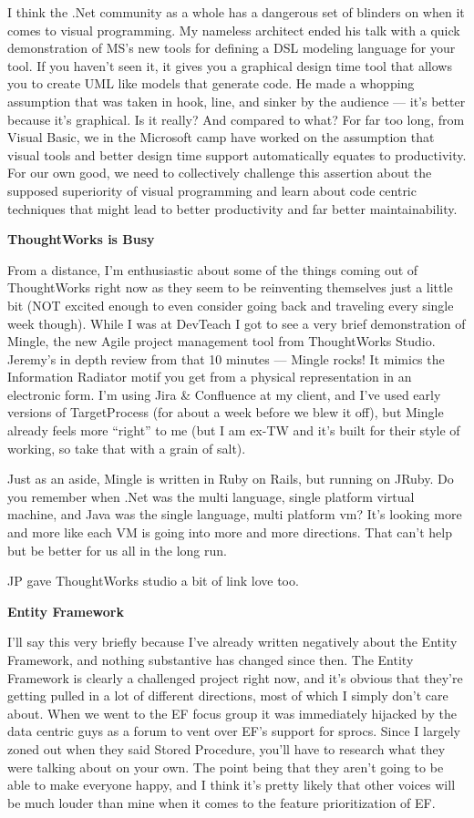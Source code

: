 \documentclass{article}
\begin{document}
{I think the .Net community as a whole has a dangerous set of blinders on when it comes to visual programming.  My nameless architect ended his talk with a quick demonstration of MS's new tools for defining a DSL modeling language for your tool.  If you haven't seen it, it gives you a graphical design time tool that allows you to create UML like models that generate code.  He made a whopping assumption that was taken in hook, line, and sinker by the audience — it's better because it's graphical.  Is it really?  And compared to what?  For far too long, from Visual Basic, we in the Microsoft camp have worked on the assumption that visual tools and better design time support automatically equates to productivity.  For our own good, we need to collectively challenge this assertion about the supposed superiority of visual programming and learn about code centric techniques that might lead to better productivity and far better maintainability.

 
\Large {\textbf {ThoughtWorks is Busy}}

From a distance, I'm enthusiastic about some of the things coming out of ThoughtWorks right now as they seem to be reinventing themselves just a little bit (NOT excited enough to even consider going back and traveling every single week though).  While I was at DevTeach I got to see a very brief demonstration of Mingle, the new Agile project management tool from ThoughtWorks Studio.  Jeremy's in depth review from that 10 minutes — Mingle rocks!  It mimics the Information Radiator motif you get from a physical representation in an electronic form.  I'm using Jira \& Confluence at my client, and I've used early versions of TargetProcess (for about a week before we blew it off), but Mingle already feels more “right” to me (but I am ex-TW and it's built for their style of working, so take that with a grain of salt).  

Just as an aside, Mingle is written in Ruby on Rails, but running on JRuby.  Do you remember when .Net was the multi language, single platform virtual machine, and Java was the single language, multi platform vm?  It's looking more and more like each VM is going into more and more directions.  That can't help but be better for us all in the long run.

JP gave ThoughtWorks studio a bit of link love too.
 
\Large {\textbf {Entity Framework}}

I'll say this very briefly because I've already written negatively about the Entity Framework, and nothing substantive has changed since then.  The Entity Framework is clearly a challenged project right now, and it's obvious that they're getting pulled in a lot of different directions, most of which I simply don't care about.  When we went to the EF focus group it was immediately hijacked by the data centric guys as a forum to vent over EF's support for sprocs.  Since I largely zoned out when they said Stored Procedure, you'll have to research what they were talking about on your own.  The point being that they aren't going to be able to make everyone happy, and I think it's pretty likely that other voices will be much louder than mine when it comes to the feature prioritization of EF.

}
\end{document}
